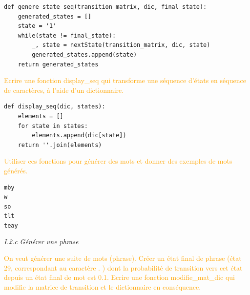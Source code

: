 \documentclass[11pt,a4paper,fleqn]{article}
\begin{document}
\lstset{language=Python}
\lstset{frame=lines}
\lstset{basicstyle=\footnotesize}
\begin{lstlisting}
def genere_state_seq(transition_matrix, dic, final_state):
    generated_states = []
    state = '1'
    while(state != final_state):
        _, state = nextState(transition_matrix, dic, state)
        generated_states.append(state)
    return generated_states
\end{lstlisting}

\vspace{5mm}
\textcolor{orange}{Ecrire une fonction display\_seq qui transforme une séquence d’états en séquence de caractères, à l’aide d’un dictionnaire.}

\lstset{language=Python}
\lstset{frame=lines}
\lstset{basicstyle=\footnotesize}
\begin{lstlisting}
def display_seq(dic, states):
    elements = []
    for state in states:
        elements.append(dic[state])
    return ''.join(elements)
\end{lstlisting}

\vspace{5mm}
\textcolor{orange}{Utiliser ces fonctions pour générer des mots et donner des exemples de mots générés.}

\lstset{language=Python}
\lstset{frame=lines}
\lstset{basicstyle=\footnotesize}
\begin{lstlisting}
mby 
w 
so 
tlt 
teay 
\end{lstlisting}

\vspace{5mm}
\textit{I.2.c Générer une phrase}

\textcolor{orange}{On veut générer une suite de mots (phrase). Créer un état final de phrase (état 29,
correspondant au caractère . ) dont la probabilité de transition vers cet état depuis un état
final de mot est 0.1. Ecrire une fonction modifie\_mat\_dic qui modifie la matrice de transition
et le dictionnaire en conséquence.}
\end{document}
